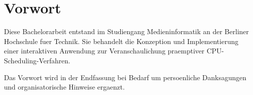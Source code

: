 \chapter*{Vorwort}

Diese Bachelorarbeit entstand im Studiengang Medieninformatik an der Berliner Hochschule fuer Technik. Sie behandelt die Konzeption und Implementierung einer interaktiven Anwendung zur Veranschaulichung praemptiver CPU-Scheduling-Verfahren.

Das Vorwort wird in der Endfassung bei Bedarf um persoenliche Danksagungen und organisatorische Hinweise ergaenzt.
